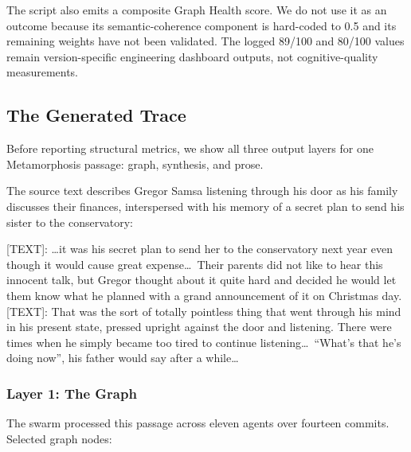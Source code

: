 The script also emits a composite Graph Health score. We do not use it as an
outcome because its semantic-coherence component is hard-coded to 0.5 and its
remaining weights have not been validated. The logged 89/100 and 80/100 values
remain version-specific engineering dashboard outputs, not cognitive-quality
measurements.

\subsection{The Generated Trace}\label{sec:generated-trace}

Before reporting structural metrics, we show all three output layers for one
Metamorphosis passage: graph, synthesis, and prose.

The source text describes Gregor Samsa listening through his door as his family discusses their finances, interspersed with his memory of a secret plan to send his sister to the conservatory:

\begin{metabox}
{[TEXT]}: \textrm{\ldots it was his secret plan to send her to the conservatory next year even though it would cause great expense\ldots\ Their parents did not like to hear this innocent talk, but Gregor thought about it quite hard and decided he would let them know what he planned with a grand announcement of it on Christmas day.}\\[0.5em]
{[TEXT]}: \textrm{That was the sort of totally pointless thing that went through his mind in his present state, pressed upright against the door and listening. There were times when he simply became too tired to continue listening\ldots\ ``What's that he's doing now'', his father would say after a while\ldots}
\end{metabox}

\subsubsection{Layer 1: The Graph}

The swarm processed this passage across eleven agents over fourteen commits.
Selected graph nodes:

